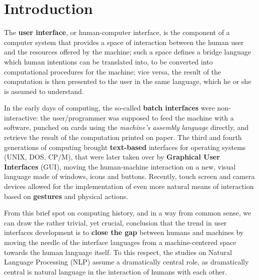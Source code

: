 
\chapter{Introduction} %

\label{ch:Introduction} %




The \textbf{user interface}, or human-computer interface, is the component of a computer system that provides a space of interaction between the human user and the resources offered by the machine; such a space defines a bridge language which human intentions can be translated into, to be converted into computational procedures for the machine; vice versa, the result of the computation is then presented to the user in the same language, which he or she is assumed to understand.

In the early days of computing, the so-called \textbf{batch interfaces} were non-interactive: the user/programmer was supposed to feed the machine with a software, punched on cards using the \textit{machine's assembly language} directly, and retrieve the result of the computation printed on paper. The third and fourth generations of computing brought \textbf{text-based} interfaces for operating systems (UNIX, DOS, CP/M), that were later taken over by \textbf{Graphical User Interfaces} (GUI), moving the human-machine interaction on a new, visual language made of windows, icons and buttons. Recently, touch screen and camera devices allowed for the implementation of even more natural means of interaction based on \textbf{gestures} and physical actions.

From this brief spot on computing history, and in a way from common sense, we can draw the rather trivial, yet crucial, conclusion that the trend in user interfaces development is to \textbf{close the gap} between humans and machines by moving the needle of the interface languages from a machine-centered space towards the human language itself. To this respect, the studies on Natural Language Processing (NLP) assume a dramatically central role, as dramatically central is natural language in the interaction of humans with each other.

